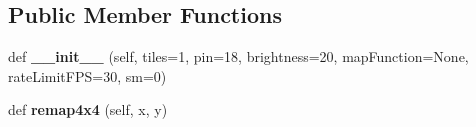 \subsection*{Public Member Functions}
\begin{DoxyCompactItemize}
\item 
\mbox{\label{classglowbit_1_1matrix4x4_a9a9f870a9505b2a4e27519a8e279e81c}} 
def {\bfseries \+\_\+\+\_\+init\+\_\+\+\_\+} (self, tiles=1, pin=18, brightness=20, map\+Function=None, rate\+Limit\+F\+PS=30, sm=0)
\item 
\mbox{\label{classglowbit_1_1matrix4x4_aea814e3be265990137d4027ae181e58d}} 
def {\bfseries remap4x4} (self, x, y)
\end{DoxyCompactItemize}
